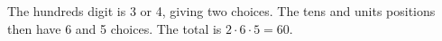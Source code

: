 The hundreds digit is 3 or 4, giving two choices. The tens and units positions then have 6 and 5 choices. The total is $ 2\cdot6\cdot5=\boxed{60}$.
